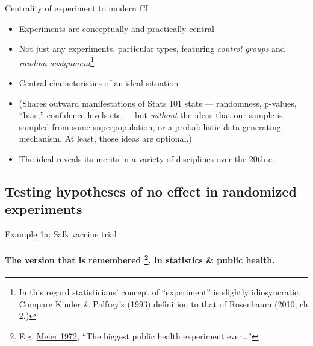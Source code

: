 \begin{frame}{Centrality of experiment to modern CI}
  \begin{itemize}
  \item Experiments are conceptually and practically central
  \item Not just any experiments, particular types, featuring
    \textit{control groups} and \textit{random assignment}\footnote{In
    this regard statisticians' concept of ``experiment'' is slightly
    idiosyncratic.  Compare Kinder \& Palfrey's (1993) definition to that of
    Rosenbaum (2010, ch 2.)}
\item Central characteristics of an ideal situation
  \item (Shares outward manifestations of Stats 101 stats ---
    randomness, p-values, ``bias,'' confidence levels etc --- but
    \textit{without} the ideas that our sample is sampled from some
    superpopulation, or a probabilistic data generating mechanism.
    At least, those ideas are optional.) 
  \item The ideal reveals its merits in a variety of disciplines over
    the 20th c.
  \end{itemize}
\end{frame}

\subsection{Testing hypotheses of no effect in randomized experiments}
\begin{frame}{Example 1a: Salk vaccine trial}
\framesubtitle{
   The version that is remembered \footnote{E.g.
      \href{http://www.cengage.com/resource_uploads/downloads/0534094929_46500.pdf}{Meier
        1972}, ``The biggest public health experiment ever\ldots''}, in statistics \& public health. }



\end{frame}

